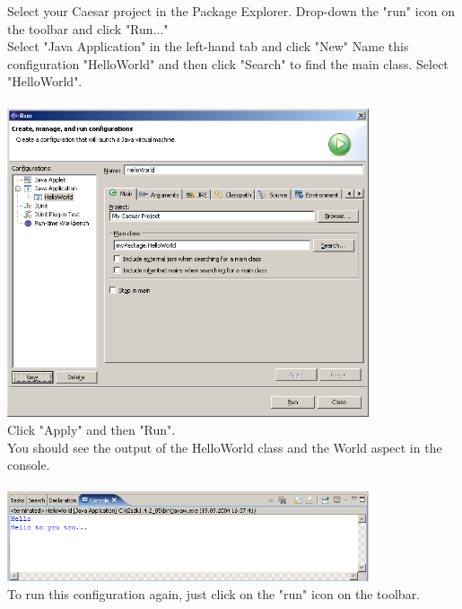 Select your Caesar project in the Package Explorer. Drop-down the "run" icon on the toolbar and click "Run..."\\
Select "Java Application" in the left-hand tab and click "New"
Name this configuration "HelloWorld" and then click "Search" to find the main class. Select "HelloWorld".\\\\
\includegraphics[width=0.80\textwidth]{images/run.png}\\

Click "Apply" and then "Run".\\
You should see the output of the HelloWorld class and the World aspect in the console.\\\\
\includegraphics[width=0.80\textwidth]{images/console.png}\\


To run this configuration again, just click on the "run" icon on the toolbar.
